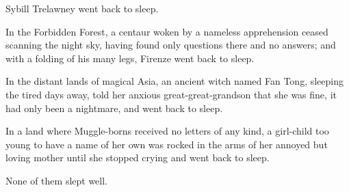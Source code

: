 Sybill Trelawney went back to sleep.

In the Forbidden Forest, a centaur woken by a nameless apprehension ceased scanning the night sky, having found only questions there and no answers; and with a folding of his many legs, Firenze went back to sleep.

In the distant lands of magical Asia, an ancient witch named Fan Tong, sleeping the tired days away, told her anxious great-great-grandson that she was fine, it had only been a nightmare, and went back to sleep.

In a land where Muggle-borns received no letters of any kind, a girl-child too young to have a name of her own was rocked in the arms of her annoyed but loving mother until she stopped crying and went back to sleep.

None of them slept well.

